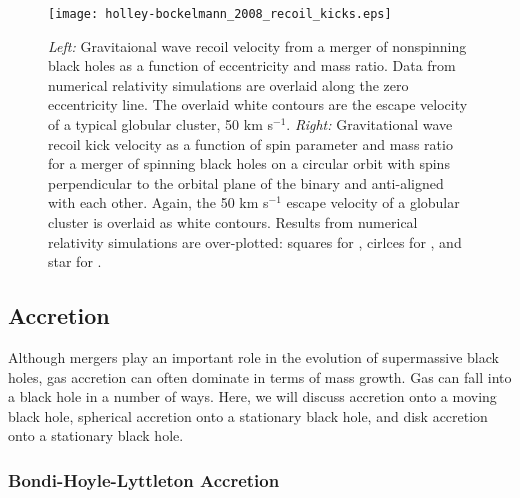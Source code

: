 \begin{figure}[t]
\centering
\texttt{[image: holley-bockelmann\_2008\_recoil\_kicks.eps]}
\caption[Gravitaional wave recoil velocity from black hole mergers]{\footnotesize \textit{Left:} Gravitaional wave recoil velocity from a merger of nonspinning black holes as a function of eccentricity and mass ratio.  Data from numerical relativity simulations \citep{gonzalez_2007} are overlaid along the zero eccentricity line.  The overlaid white contours are the escape velocity of a typical globular cluster, 50 km s$^{-1}$.  \textit{Right:} Gravitational wave recoil kick velocity as a function of spin parameter and mass ratio for a merger of spinning black holes on a circular orbit with spins perpendicular to the orbital plane of the binary and anti-aligned with each other.  Again, the 50 km s$^{-1}$ escape velocity of a globular cluster is overlaid as white contours.  Results from numerical relativity simulations are over-plotted:  squares for \citet{koppitz_2007}, cirlces for \citet{herrmann_2007}, and star for \citet{brugmann_2004}.  \citep{holley-bockelmann_2008}}
\label{fig:recoil_kicks}
\end{figure}



\subsection{Accretion}

Although mergers play an important role in the evolution of supermassive black holes, gas accretion can often dominate in terms of mass growth.  Gas can fall into a black hole in a number of ways.  Here, we will discuss accretion onto a moving black hole, spherical accretion onto a stationary black hole, and disk accretion onto a stationary black hole.


\subsubsection{Bondi-Hoyle-Lyttleton Accretion}

